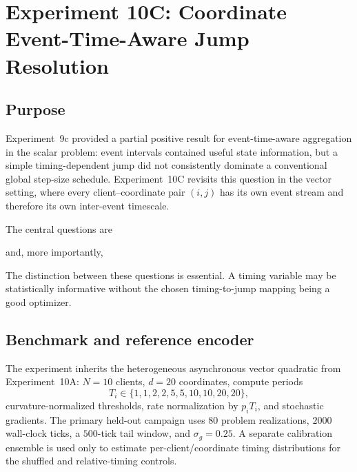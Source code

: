 \section{Experiment 10C: Coordinate Event-Time-Aware Jump Resolution}
\label{sec:exp10c}

\subsection{Purpose}

Experiment~9c provided a partial positive result for event-time-aware aggregation in the scalar problem: event intervals contained useful state information, but a simple timing-dependent jump did not consistently dominate a conventional global step-size schedule. Experiment~10C revisits this question in the vector setting, where every client--coordinate pair $(i,j)$ has its own event stream and therefore its own inter-event timescale.

The central questions are
\begin{center}
\end{center}
and, more importantly,
\begin{center}
\end{center}

The distinction between these questions is essential. A timing variable may be statistically informative without the chosen timing-to-jump mapping being a good optimizer.

\subsection{Benchmark and reference encoder}

The experiment inherits the heterogeneous asynchronous vector quadratic from Experiment~10A: $N=10$ clients, $d=20$ coordinates, compute periods
\begin{equation}
  T_i\in\{1,1,2,2,5,5,10,10,20,20\},
\end{equation}
curvature-normalized thresholds, rate normalization by $p_iT_i$, and stochastic gradients. The primary held-out campaign uses $80$ problem realizations, $2000$ wall-clock ticks, a $500$-tick tail window, and $\sigma_g=0.25$. A separate calibration ensemble is used only to estimate per-client/coordinate timing distributions for the shuffled and relative-timing controls.

